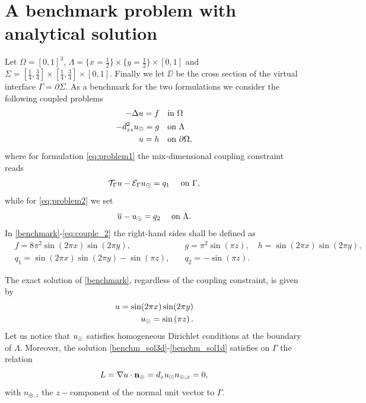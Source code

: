 \section{A benchmark problem with analytical solution}


Let $\Omega=[0,1]^3$, $\Lambda=\{x=\tfrac{1}{2}\}\times \{y=\tfrac{1}{2}\} \times [0,1] $
and $\Sigma=[\tfrac{1}{4}, \tfrac{3}{4}]\times [\tfrac{1}{4}, \tfrac{3}{4}]\times [0, 1]$.
Finally we let $\DD$ be the cross section of the virtual interface $\Gamma=\partial \Sigma$.
As a benchmark for the two formulations we consider the following coupled problems
%
\begin{subequations}\label{benchmark}
\begin{align}
\label{benchm_3d}
-\Delta u=f \quad &\text{in $\Omega$}\\
\label{benchm_1d}
-d_{zz}^2 \ud =g \quad &\text{on $\Lambda$}\\
u=h \quad &\text{on $\partial \Omega$},
\end{align}
\end{subequations}
where for formulation \eqref{eq:problem1} the mix-dimensional coupling constraint reads
\begin{equation}
  \label{eq:couple_1}
\trace{u} - \ext{\ud} = q_1\quad\text{ on }\Gamma,
\end{equation}
while for \eqref{eq:problem2} we set
\begin{equation}
    \label{eq:couple_2}
\avrc{u} - \ud = q_2\quad\text{ on }\Lambda.
\end{equation}
%
In \eqref{benchmark}-\eqref{eq:couple_2} the right-hand sides shall be defined as 
\begin{eqnarray*}
  &f=8\pi ^2 \sin (2\pi x) \sin (2\pi y),\quad &g={\pi ^2}\sin \left({\pi z}\right),\quad h=\sin (2\pi x) \sin (2\pi y),\\
  &q_1=\sin (2\pi x) \sin (2\pi y) - \sin \left({\pi z}\right),\quad &q_2=-\sin \left({\pi z}\right).
\end{eqnarray*}

The exact solution of \eqref{benchmark}, regardless of the coupling constraint,
is given by
%
\begin{eqnarray}
\label{benchm_sol3d}
u=\sin (2\pi x) \sin (2\pi y)\\
\label{benchm_sol1d}
\ud=\sin \left({\pi z}\right).
\end{eqnarray}
%
Let us notice that $u_{\odot}$ satisfies homogeneous Dirichlet conditions at the boundary of $\Lambda$.
Moreover, the solution \eqref{benchm_sol3d}-\eqref{benchm_sol1d} satisfies on $\Gamma$ the relation
\begin{equation}\label{benchm_flux}
L=\nabla u \cdot \textbf{n}_{\oplus}=d_z \ud n_{\oplus,z}=0,
\end{equation}
with $n_{\oplus,z}$ the $z-$component of the normal unit vector to $\Gamma$.

